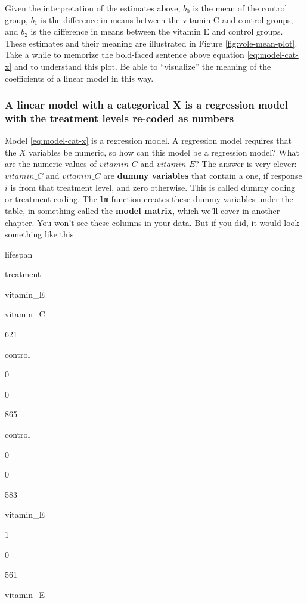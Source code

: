 \documentclass[]{book}
\begin{document}
Given the interpretation of the estimates above, \(b_0\) is the mean of
the control group, \(b_1\) is the difference in means between the
vitamin C and control groups, and \(b_2\) is the difference in means
between the vitamin E and control groups. These estimates and their
meaning are illustrated in Figure \ref{fig:vole-mean-plot}. Take a while
to memorize the bold-faced sentence above equation \eqref{eq:model-cat-x}
and to understand this plot. Be able to ``visualize'' the meaning of the
coefficients of a linear model in this way.

\subsubsection{A linear model with a categorical X is a regression model
with the treatment levels re-coded as
numbers}\label{a-linear-model-with-a-categorical-x-is-a-regression-model-with-the-treatment-levels-re-coded-as-numbers}

Model \eqref{eq:model-cat-x} is a regression model. A regression model
requires that the \(X\) variables be numeric, so how can this model be a
regression model? What are the numeric values of \(vitamin\_C\) and
\(vitamin\_E\)? The answer is very clever: \(vitamin\_C\) and
\(vitamin\_C\) are \textbf{dummy variables} that contain a one, if
response \(i\) is from that treatment level, and zero otherwise. This is
called dummy coding or treatment coding. The \texttt{lm} function
creates these dummy variables under the table, in something called the
\textbf{model matrix}, which we'll cover in another chapter. You won't
see these columns in your data. But if you did, it would look something
like this

lifespan

treatment

vitamin\_E

vitamin\_C

621

control

0

0

865

control

0

0

583

vitamin\_E

1

0

561

vitamin\_E
\end{document}
